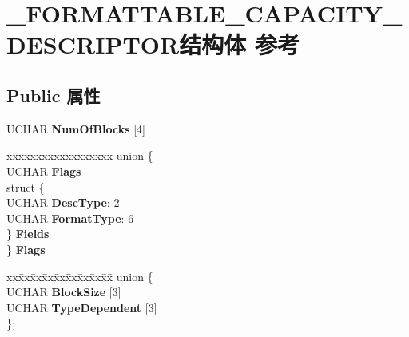 \hypertarget{struct___f_o_r_m_a_t_t_a_b_l_e___c_a_p_a_c_i_t_y___d_e_s_c_r_i_p_t_o_r}{}\section{\+\_\+\+F\+O\+R\+M\+A\+T\+T\+A\+B\+L\+E\+\_\+\+C\+A\+P\+A\+C\+I\+T\+Y\+\_\+\+D\+E\+S\+C\+R\+I\+P\+T\+O\+R结构体 参考}
\label{struct___f_o_r_m_a_t_t_a_b_l_e___c_a_p_a_c_i_t_y___d_e_s_c_r_i_p_t_o_r}
\subsection*{Public 属性}
\begin{DoxyCompactItemize}
\item 
\mbox{\label{struct___f_o_r_m_a_t_t_a_b_l_e___c_a_p_a_c_i_t_y___d_e_s_c_r_i_p_t_o_r_a474dce2669abeff36bf3b702f66d7c92}} 
U\+C\+H\+AR {\bfseries Num\+Of\+Blocks} \mbox{[}4\mbox{]}
\item 
\mbox{\label{struct___f_o_r_m_a_t_t_a_b_l_e___c_a_p_a_c_i_t_y___d_e_s_c_r_i_p_t_o_r_a6f8f7e2bf769d4ba85be299bf2f41798}} 
\begin{tabbing}
xx\=xx\=xx\=xx\=xx\=xx\=xx\=xx\=xx\=\kill
union \{\\
\>UCHAR {\bfseries Flags}\\
\>struct \{\\
\>\>UCHAR {\bfseries DescType}: 2\\
\>\>UCHAR {\bfseries FormatType}: 6\\
\>\} {\bfseries Fields}\\
\} {\bfseries Flags}\\

\end{tabbing}\item 
\mbox{\label{struct___f_o_r_m_a_t_t_a_b_l_e___c_a_p_a_c_i_t_y___d_e_s_c_r_i_p_t_o_r_a305afd949b2e328682a689aaafab939d}} 
\begin{tabbing}
xx\=xx\=xx\=xx\=xx\=xx\=xx\=xx\=xx\=\kill
union \{\\
\>UCHAR {\bfseries BlockSize} \mbox{[}3\mbox{]}\\
\>UCHAR {\bfseries TypeDependent} \mbox{[}3\mbox{]}\\
\}; \\


\end{tabbing}
\end{DoxyCompactItemize}
